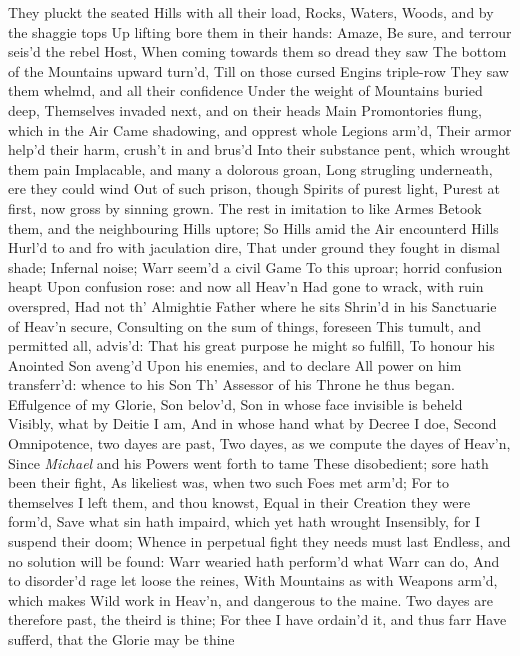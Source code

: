 \documentclass[11pt]{book}
\newcounter {first}
\newcounter {last}
\begin{document}
They pluckt the seated Hills with all their load, 
Rocks, Waters, Woods, and by the shaggie tops 
Up lifting bore them in their hands: Amaze, 
Be sure, and terrour seis'd the rebel Host, 
When coming towards them so dread they saw 
The bottom of the Mountains upward turn'd, 
Till on those cursed Engins triple-row 
They saw them whelmd, and all their confidence 
Under the weight of Mountains buried deep, 
Themselves invaded next, and on their heads 
Main Promontories flung, which in the Air 
Came shadowing, and opprest whole Legions arm'd, 
Their armor help'd their harm, crush't in and brus'd 
Into their substance pent, which wrought them pain 
Implacable, and many a dolorous groan, 
Long strugling underneath, ere they could wind 
Out of such prison, though Spirits of purest light, 
Purest at first, now gross by sinning grown. 
The rest in imitation to like Armes 
Betook them, and the neighbouring Hills uptore; 
So Hills amid the Air encounterd Hills 
Hurl'd to and fro with jaculation dire, 
That under ground they fought in dismal shade; 
Infernal noise; Warr seem'd a civil Game 
To this uproar; horrid confusion heapt 
Upon confusion rose: and now all Heav'n 
Had gone to wrack, with ruin overspred, 
Had not th' Almightie Father where he sits 
Shrin'd in his Sanctuarie of Heav'n secure, 
Consulting on the sum of things, foreseen 
This tumult, and permitted all, advis'd: 
That his great purpose he might so fulfill, 
To honour his Anointed Son aveng'd 
Upon his enemies, and to declare 
All power on him transferr'd: whence to his Son 
Th' Assessor of his Throne he thus began. 
\quad Effulgence of my Glorie, Son belov'd, 
Son in whose face invisible is beheld 
Visibly, what by Deitie I am, 
And in whose hand what by Decree I doe, 
Second Omnipotence, two dayes are past, 
Two dayes, as we compute the dayes of Heav'n, 
Since \textit{Michael} and his Powers went forth to tame 
These disobedient; sore hath been their fight, 
As likeliest was, when two such Foes met arm'd; 
For to themselves I left them, and thou knowst, 
Equal in their Creation they were form'd, 
Save what sin hath impaird, which yet hath wrought 
Insensibly, for I suspend their doom; 
Whence in perpetual fight they needs must last 
Endless, and no solution will be found: 
Warr wearied hath perform'd what Warr can do, 
And to disorder'd rage let loose the reines, 
With Mountains as with Weapons arm'd, which makes 
Wild work in Heav'n, and dangerous to the maine. 
Two dayes are therefore past, the theird is thine; 
For thee I have ordain'd it, and thus farr 
Have sufferd, that the Glorie may be thine 
\end{document}
